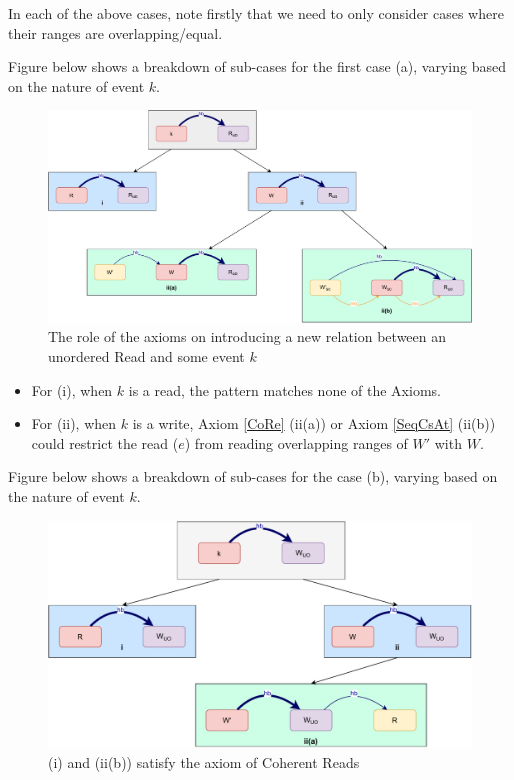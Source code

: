     In each of the above cases, note firstly that we need to only consider cases where their ranges are overlapping/equal.
    
    Figure below shows a breakdown of sub-cases for the first case (a), varying based
    on the nature of event $k$.
    \begin{figure}[H]
        \centering
        \includegraphics[scale=0.6]{5.InstructionReordering/4.ValidReorderingCandidate/ProofParts/Part4/part4(a).pdf}
        \caption{The role of the axioms on introducing a new relation between an unordered Read and some event $k$}
        \label{fig:my_label}
    \end{figure}
    
    \begin{itemize}
        
        \item For (i), when $k$ is a read, the pattern matches none of the Axioms.
        \item For (ii), when $k$ is a write, Axiom \ref{CoRe} (ii(a)) or Axiom \ref{SeqCsAt} (ii(b)) could restrict the read ($e$) from reading overlapping ranges of $W'$ with $W$.
    \end{itemize}
    
    Figure below shows a breakdown of sub-cases for the case (b), varying based
    on the nature of event $k$.
    \begin{figure}[H]
        \centering
        \includegraphics[scale=0.6]{5.InstructionReordering/4.ValidReorderingCandidate/ProofParts/Part4/part4(b).pdf}
        \caption{(i) and (ii(b)) satisfy the axiom of Coherent Reads}
        \label{fig:my_label}
    \end{figure}
          
